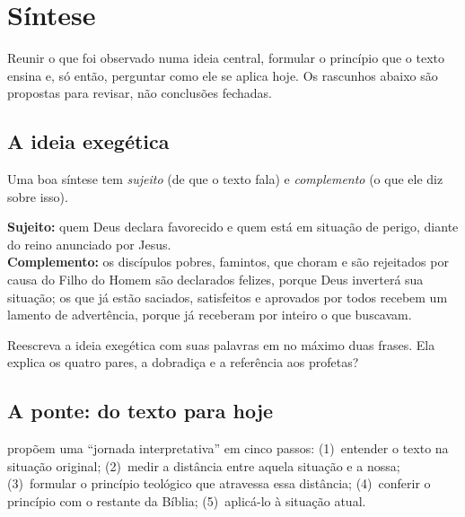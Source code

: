 \chapter{Síntese}\label{cap:sintese}

\begin{objetivo}
Reunir o que foi observado numa ideia central, formular o princípio que o
texto ensina e, só então, perguntar como ele se aplica hoje. Os rascunhos
abaixo são propostas para revisar, não conclusões fechadas.
\end{objetivo}

\section{A ideia exegética}

Uma boa síntese tem \emph{sujeito} (de que o texto fala) e
\emph{complemento} (o que ele diz sobre isso).

\begin{nota}[Rascunho]
\textbf{Sujeito:} quem Deus declara favorecido e quem está em situação de
perigo, diante do reino anunciado por Jesus.\\
\textbf{Complemento:} os discípulos pobres, famintos, que choram e são
rejeitados por causa do Filho do Homem são declarados felizes, porque Deus
inverterá sua situação; os que já estão saciados, satisfeitos e aprovados
por todos recebem um lamento de advertência, porque já receberam por inteiro
o que buscavam.
\end{nota}

\begin{pergunta}
Reescreva a ideia exegética com suas palavras em no máximo duas frases.
Ela explica os quatro pares, a dobradiça  e a referência aos
profetas?
\end{pergunta}

\section{A ponte: do texto para hoje}

\textcite{duvall2012} propõem uma \enquote{jornada interpretativa} em cinco
passos: (1)~entender o texto na situação original; (2)~medir a distância entre
aquela situação e a nossa; (3)~formular o princípio teológico que atravessa
essa distância; (4)~conferir o princípio com o restante da Bíblia;
(5)~aplicá-lo à situação atual.

